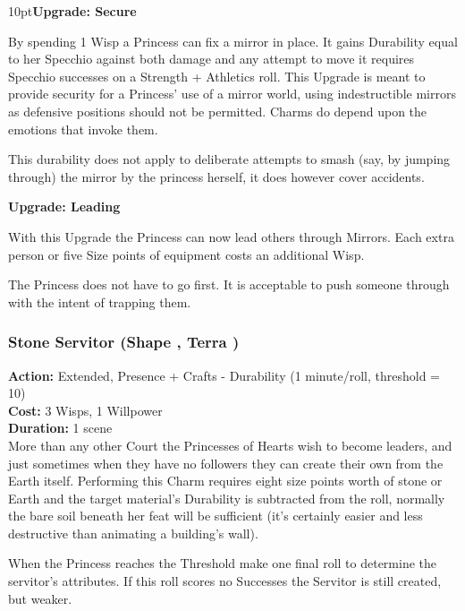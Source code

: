 \begin{myindentpar}{10pt}\textbf{Upgrade: Secure}

By spending 1 Wisp a Princess can fix a mirror in place. It gains Durability equal to her Specchio against both damage and any attempt to move it requires Specchio successes on a Strength + Athletics roll. This Upgrade is meant to provide security for a Princess' use of a mirror world, using indestructible mirrors as defensive positions should not be permitted. Charms do depend upon the emotions that invoke them.

This durability does not apply to deliberate attempts to smash (say, by jumping through) the mirror by the princess herself, it does however cover accidents.

\textbf{Upgrade: Leading}

With this Upgrade the Princess can now lead others through Mirrors. Each extra person or five Size points of equipment costs an additional Wisp.

The Princess does not have to go first. It is acceptable to push someone through with the intent of trapping them.\end{myindentpar}


\subsubsection*{Stone Servitor (Shape \textbullet\textbullet\textbullet\textbullet\textbullet, Terra \textbullet\textbullet\textbullet)}

\noindent \textbf{Action:} Extended, Presence + Crafts - Durability (1 minute/roll, threshold = 10)\\

\noindent \textbf{Cost:} 3 Wisps, 1 Willpower\\

\noindent \textbf{Duration:} 1 scene\\

\noindent More than any other Court the Princesses of Hearts wish to become leaders, and just sometimes when they have no followers they can create their own from the Earth itself. Performing this Charm requires eight size points worth of stone or Earth and the target material's Durability is subtracted from the roll, normally the bare soil beneath her feat will be sufficient (it's certainly easier and less destructive than animating a building's wall).

When the Princess reaches the Threshold make one final roll to determine the servitor’s attributes. If this roll scores no Successes the Servitor is still created, but weaker.

